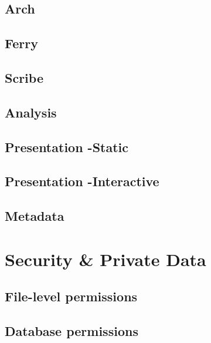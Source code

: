 \documentclass[]{book}
\begin{document}
\hypertarget{arch}{%
\section{Arch}\label{arch}}

\hypertarget{ferry}{%
\section{Ferry}\label{ferry}}

\hypertarget{scribe}{%
\section{Scribe}\label{scribe}}

\hypertarget{analysis-1}{%
\section{Analysis}\label{analysis-1}}

\hypertarget{presentation--static}{%
\section{Presentation -Static}\label{presentation--static}}

\hypertarget{presentation--interactive}{%
\section{Presentation -Interactive}\label{presentation--interactive}}

\hypertarget{metadata}{%
\section{Metadata}\label{metadata}}

\hypertarget{security}{%
\chapter{Security \& Private Data}\label{security}}

\hypertarget{file-level-permissions}{%
\section{File-level permissions}\label{file-level-permissions}}

\hypertarget{database-permissions}{%
\section{Database permissions}\label{database-permissions}}
\end{document}
